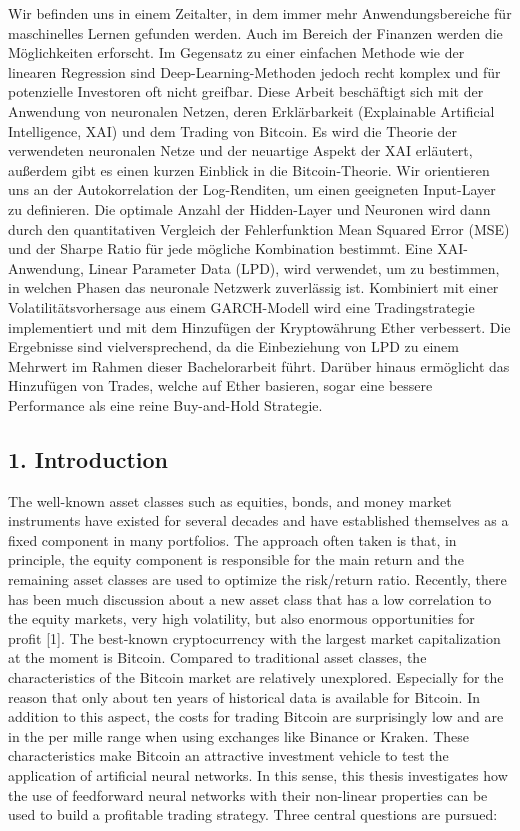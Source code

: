 \documentclass[
]{article}
\begin{document}
Wir befinden uns in einem Zeitalter, in dem immer mehr
Anwendungsbereiche für maschinelles Lernen gefunden werden. Auch im
Bereich der Finanzen werden die Möglichkeiten erforscht. Im Gegensatz zu
einer einfachen Methode wie der linearen Regression sind
Deep-Learning-Methoden jedoch recht komplex und für potenzielle
Investoren oft nicht greifbar. Diese Arbeit beschäftigt sich mit der
Anwendung von neuronalen Netzen, deren Erklärbarkeit (Explainable
Artificial Intelligence, XAI) und dem Trading von Bitcoin. Es wird die
Theorie der verwendeten neuronalen Netze und der neuartige Aspekt der
XAI erläutert, außerdem gibt es einen kurzen Einblick in die
Bitcoin-Theorie. Wir orientieren uns an der Autokorrelation der
Log-Renditen, um einen geeigneten Input-Layer zu definieren. Die
optimale Anzahl der Hidden-Layer und Neuronen wird dann durch den
quantitativen Vergleich der Fehlerfunktion Mean Squared Error (MSE) und
der Sharpe Ratio für jede mögliche Kombination bestimmt. Eine
XAI-Anwendung, Linear Parameter Data (LPD), wird verwendet, um zu
bestimmen, in welchen Phasen das neuronale Netzwerk zuverlässig ist.
Kombiniert mit einer Volatilitätsvorhersage aus einem GARCH-Modell wird
eine Tradingstrategie implementiert und mit dem Hinzufügen der
Kryptowährung Ether verbessert. Die Ergebnisse sind vielversprechend, da
die Einbeziehung von LPD zu einem Mehrwert im Rahmen dieser
Bachelorarbeit führt. Darüber hinaus ermöglicht das Hinzufügen von
Trades, welche auf Ether basieren, sogar eine bessere Performance als
eine reine Buy-and-Hold Strategie.

\newpage


\hypertarget{introduction}{%
\subsection{1. Introduction}\label{introduction}}

The well-known asset classes such as equities, bonds, and money market
instruments have existed for several decades and have established
themselves as a fixed component in many portfolios. The approach often
taken is that, in principle, the equity component is responsible for the
main return and the remaining asset classes are used to optimize the
risk/return ratio. Recently, there has been much discussion about a new
asset class that has a low correlation to the equity markets, very high
volatility, but also enormous opportunities for profit {[}1{]}. The
best-known cryptocurrency with the largest market capitalization at the
moment is Bitcoin. Compared to traditional asset classes, the
characteristics of the Bitcoin market are relatively unexplored.
Especially for the reason that only about ten years of historical data
is available for Bitcoin. In addition to this aspect, the costs for
trading Bitcoin are surprisingly low and are in the per mille range when
using exchanges like Binance or Kraken. These characteristics make
Bitcoin an attractive investment vehicle to test the application of
artificial neural networks. In this sense, this thesis investigates how
the use of feedforward neural networks with their non-linear properties
can be used to build a profitable trading strategy. Three central
questions are pursued:
\end{document}
